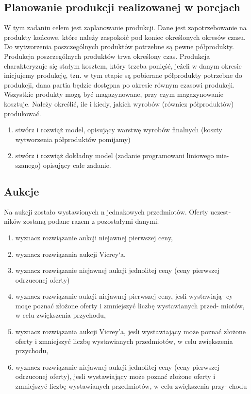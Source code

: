 \documentclass[
    12pt, %
]{../fphw}
\begin{document}
\subsection{Planowanie produkcji realizowanej w porcjach}
W tym zadaniu celem jest zaplanowanie produkcji. Dane jest zapotrzebowanie na produkty końcowe,
które należy zaspokoić pod koniec określonych okresów czasu. Do wytworzenia poszczególnych produktów potrzebne
są pewne półprodukty. Produkcja poszczególnych produktów trwa określony czas.
Produkcja charakteryzuje się stałym kosztem, który trzeba ponięść,
jeżeli w danym okresie inicjujemy produkcję, tzn. w tym etapie są pobierane
półprodukty potrzebne do produkcji, dana partia będzie dostępna po okresie
równym czasowi produkcji. Wszystkie produkty mogą być magazynowane,
przy czym magazynowanie kosztuje.
Należy określić, ile i kiedy, jakich wyrobów (równiez półproduktów) produkować.

\begin{enumerate}
    \item stwórz i rozwiąż model, opisujący warstwę wyrobów finalnych (koszty
          wytworzenia półproduktów pomijamy)
    \item stwórz i rozwiąż dokładny model (zadanie programowani liniowego mie-
          szanego) opisujący całe zadanie.
\end{enumerate}

\subsection{Aukcje}
Na aukcji zostało wystawionych n jednakowych przedmiotów. Oferty uczest-
ników zostaną podane razem z pozostałymi danymi.

\begin{enumerate}
    \item wyznacz rozwiązanie aukcji niejawnej pierwszej ceny,
    \item wyznacz rozwiązania aukcji Vicrey`a,
    \item wyznacz rozwiązanie niejawnej aukcji jednolitej ceny (ceny pierwszej
          odrzuconej oferty)
    \item wyznacz rozwiązanie aukcji niejawnej pierwszej ceny, jesli wystawiają-
          cy moąe poznać złożone oferty i zmniejszyć liczbę wystawianych przed-
          miotów, w celu zwiększenia przychodu,
    \item wyznacz rozwiązania aukcji Vicrey’a, jesli wystawiający może poznać
          złożone oferty i zmniejszyć liczbę wystawianych przedmiotów, w celu
          zwiększenia przychodu,
    \item wyznacz rozwiązanie niejawnej aukcji jednolitej ceny (ceny pierwszej
          odrzuconej oferty), jesli wystawiający może poznać złożone oferty i
          zmniejszyć liczbę wystawianych przedmiotów, w celu zwiększenia przy-
          chodu
\end{enumerate}
\newpage
\end{document}

